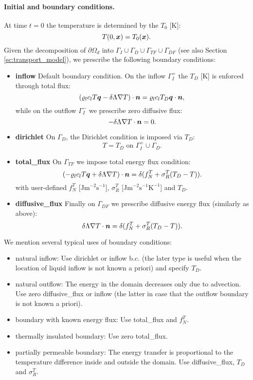 \paragraph{Initial and boundary conditions.}
At time $t=0$ the temperature is determined by the  $T_0$ [K]:
\[ T(0,\mathbf{\boldsymbol{x}}) = T_0(\mathbf{\boldsymbol{x}}). \]
Given the decomposition of $\partial\Omega_d$ into $\Gamma_I\cup\Gamma_D\cup\Gamma_{TF}\cup\Gamma_{DF}$ (see also Section \ref{sc:transport_model}), we prescribe the following boundary conditions:
\begin{itemize}
\item \textbf{inflow} Default boundary condition. On the inflow $\Gamma_I^+$ the  $T_D$ [K] is enforced through total flux:
\[ \left(\varrho_l c_l T \mathbf{\boldsymbol{q}} - \delta\Lambda\nabla T\right)\cdot\mathbf{\boldsymbol{n}} = \varrho_l c_l T_D\mathbf{\boldsymbol{q}}\cdot\mathbf{\boldsymbol{n}}, \]
while on the outflow $\Gamma_I^-$ we prescribe zero diffusive flux:
\[ -\delta\Lambda\nabla T\cdot\mathbf{\boldsymbol{n}} = 0. \] 
\item \textbf{dirichlet} On $\Gamma_D$, the Dirichlet condition is imposed via  $T_D$:
\[ T = T_D \mbox{ on }\Gamma_I^+\cup\Gamma_D. \]
\item \textbf{total\_flux}
On $\Gamma_{TF}$ we impose total energy flux condition:
\[ \left(-\varrho_l c_l T \mathbf{\boldsymbol{q}} + \delta\Lambda\nabla T\right)\cdot\mathbf{\boldsymbol{n}} = \delta(f^T_N+\sigma^T_R(T_D-T)). \]
with user-defined  $f^T_N$ [J$\mathrm{m}^{-2}\mathrm{s}^{-1}$],
 $\sigma^T_R$ [J$\mathrm{m}^{-2}\mathrm{s}^{-1}\mathrm{K}^{-1}$] and  $T_D$.
\item \textbf{diffusive\_flux} Finally on $\Gamma_{DF}$ we prescribe diffusive energy flux (similarly as above):
\[ \delta\Lambda\nabla T\cdot\mathbf{\boldsymbol{n}} = \delta(f^T_N+\sigma^T_R(T_D-T)). \]
\end{itemize}
We mention several typical uses of boundary conditions:
\begin{itemize}
\item natural inflow: Use dirichlet or inflow b.c. (the later type is useful when the location of liquid inflow is not known a priori) and specify $T_D$.
\item natural outflow: The energy in the domain decreases only due to advection. Use zero diffusive\_flux or inflow (the latter in case that the outflow boundary is not known a priori).
\item boundary with known energy flux: Use total\_flux and $f_N^T$.
\item thermally insulated boundary: Use zero total\_flux.
\item partially permeable boundary: The energy transfer is proportional to the temperature difference inside and outside the domain.
Use diffusive\_flux, $T_D$ and $\sigma_R^T$.
\end{itemize}






